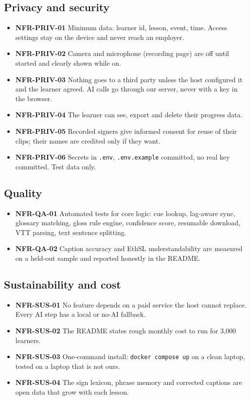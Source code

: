 \documentclass[11pt,a4paper]{article}
\newcommand{\code}[1]{\texttt{#1}}
\newcommand{\req}[1]{\textbf{#1}}
\begin{document}
\subsection{Privacy and security}
\begin{itemize}
  \item \req{NFR-PRIV-01} Minimum data: learner id, lesson, event, time. Access settings stay on the device and never reach an employer.
  \item \req{NFR-PRIV-02} Camera and microphone (recording page) are off until started and clearly shown while on.
  \item \req{NFR-PRIV-03} Nothing goes to a third party unless the host configured it and the learner agreed. AI calls go through our server, never with a key in the browser.
  \item \req{NFR-PRIV-04} The learner can see, export and delete their progress data.
  \item \req{NFR-PRIV-05} Recorded signers give informed consent for reuse of their clips; their names are credited only if they want.
  \item \req{NFR-PRIV-06} Secrets in \code{.env}, \code{.env.example} committed, no real key committed. Test data only.
\end{itemize}

\subsection{Quality}
\begin{itemize}
  \item \req{NFR-QA-01} Automated tests for core logic: cue lookup, lag-aware sync, glossary matching, gloss rule engine, confidence score, resumable download, VTT parsing, text sentence splitting.
  \item \req{NFR-QA-02} Caption accuracy and EthSL understandability are measured on a held-out sample and reported honestly in the README.
\end{itemize}

\subsection{Sustainability and cost}
\begin{itemize}
  \item \req{NFR-SUS-01} No feature depends on a paid service the host cannot replace. Every AI step has a local or no-AI fallback.
  \item \req{NFR-SUS-02} The README states rough monthly cost to run for 3,000 learners.
  \item \req{NFR-SUS-03} One-command install: \code{docker compose up} on a clean laptop, tested on a laptop that is not ours.
  \item \req{NFR-SUS-04} The sign lexicon, phrase memory and corrected captions are open data that grow with each lesson.
\end{itemize}
\end{document}
